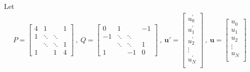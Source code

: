 \documentclass{report}
\begin{document}
Let 
\begin{align*}
P = 
\left[ 
\begin{matrix}
4 & 1 & ~ & 1\\
1 & \ddots & \ddots & ~\\
~ & \ddots & \ddots & 1\\
1 & ~ & 1 & 4
\end{matrix}
\right] 
 \ , \ 
Q =
\left[
\begin{matrix}
0& 1 & ~ & -1\\
-1 & \ddots & \ddots & ~\\
~ & \ddots & \ddots & 1\\
1 & ~ & -1 & 0
\end{matrix}
\right]
 \ , \
\textbf{u}' = 
\left[ 
\begin{matrix}
u^{\prime}_{0}\\
u^{\prime}_{1}\\
u^{\prime}_{2}\\
\vdots\\
u^{\prime}_{N}\\
\end{matrix}
\right]
  \ , \ 
\textbf{u} = \left[ 
\begin{matrix}
u^{}_{0}\\
u^{}_{1}\\
u^{}_{2}\\
\vdots\\
u^{}_{N}\\
\end{matrix}
\right]
\end{align*}
\end{document}
